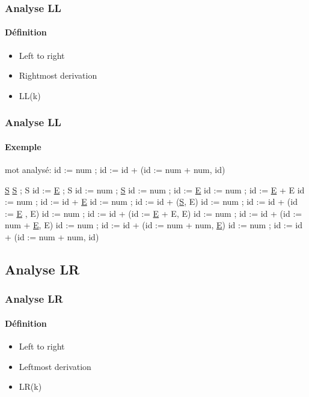 \documentclass{beamer}
\begin{document}
\begin{frame}\frametitle{Analyse LL}\framesubtitle{Définition}

\begin{itemize}
			\item Left to right\newline
			\item Rightmost derivation\newline
			\item LL(k)\newline
\end{itemize}

\end{frame}

\begin{frame}\frametitle{Analyse LL}\framesubtitle{Exemple}

mot analysé:   id := num ; id := id + (id := num + num, id)

\newline\newline
\underline{S}\newline
\underline{S} ; S\newline
id := \underline{E} ; S\newline
id := num ; \underline{S}\newline
id := num ; id := \underline{E}\newline
id := num ; id := \underline{E} + E\newline
id := num ; id := id + \underline{E}\newline
id := num ; id := id + (\underline{S}, E)\newline
id := num ; id := id + (id := \underline{E} , E)\newline
id := num ; id := id + (id := \underline{E} + E, E)\newline
id := num ; id := id + (id := num + \underline{E}, E)\newline
id := num ; id := id + (id := num + num, \underline{E})\newline
id := num ; id := id + (id := num + num, id)\newline

\end{frame}

\subsection{Analyse LR}

\begin{frame}\frametitle{Analyse LR}\framesubtitle{Définition}

\begin{itemize}
			\item Left to right\newline
			\item Leftmost derivation\newline
			\item LR(k)\newline
\end{itemize}

\end{frame}
\end{document}
